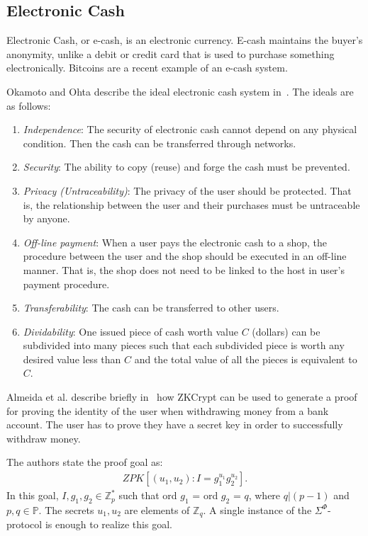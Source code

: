 \documentclass{sig-alternate}
\begin{document}
	\subsection{Electronic Cash}
	Electronic Cash, or e-cash, is an electronic currency. E-cash maintains the buyer's
	anonymity, unlike a debit or credit card that is used to purchase something 
	electronically. Bitcoins are a recent example of an e-cash system.
	
	Okamoto and Ohta describe the ideal electronic cash system in~\cite{Ecash:1991}.
	The ideals are as follows:
	
	\begin{enumerate}
		\item \textit{Independence}: The security of electronic cash cannot depend on any
		physical condition. Then the cash can be transferred through networks.
		
		\item \textit{Security}: The ability to copy (reuse) and forge the cash must be
		prevented.
		
		\item \textit{Privacy (Untraceability)}: The privacy of the user should be
		protected. That is, the relationship between the user and their purchases must
		be untraceable by anyone.
		
		\item \textit{Off-line payment}: When a user pays the electronic cash to a shop, 
		the procedure between the user and the shop should be executed in an off-line
		manner. That is, the shop does not need to be linked to the host in user's
		payment procedure.
		
		\item \textit{Transferability}: The cash can be transferred to other users.
		
		\item \textit{Dividability}: One issued piece of cash worth value $C$ (dollars)
		can be subdivided into many pieces such that each subdivided piece is worth any
		desired value less than $C$ and the total value of all the pieces is equivalent
		to $C$.
	\end{enumerate}
	
	Almeida et al. describe briefly in~\cite{ZKCrypt:2012} how ZKCrypt can be used to
	generate a proof for proving the identity of the user when withdrawing money from
	a bank account. The user has to prove they have a secret key in order to successfully
	withdraw money. 
	
	The authors state the proof goal as:
	\begin{align*}
	ZPK\left[(u_{1}, u_{2}): I = g^{u_{1}}_{1}g^{u_{2}}_{2}\right].
	\end{align*}
	In this goal, $I, g_{1}, g_{2} \in \mathbb{Z}^{*}_{p}$ such that ord $g_{1}$ = ord
	$g_{2}$ = $q$, where $q|(p - 1)$ and $p, q \in \mathbb{P}$. The secrets $u_{1}, u_{2}$
	are elements of $\mathbb{Z}_{q}$. A single instance of the $\Sigma^{\Phi}$-protocol
	is enough to realize this goal.
	
\end{document}
